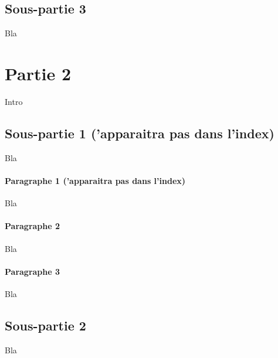 \subsection{Sous-partie 3}

Bla

\section{Partie 2}

Intro

\subsection*{Sous-partie 1 ('apparaitra pas dans l'index)} Bla

\paragraph*{Paragraphe 1 ('apparaitra pas dans l'index)} Bla

\paragraph*{Paragraphe 2} Bla

\paragraph*{Paragraphe 3} Bla

\newpage

\subsection*{Sous-partie 2}

Bla


